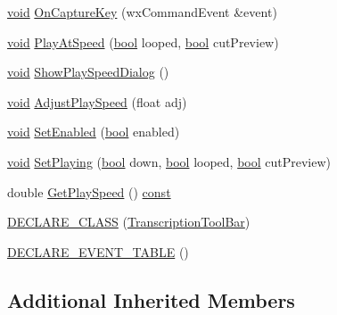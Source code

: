 \begin{DoxyCompactItemize}
\hyperlink{sound_8c_ae35f5844602719cf66324f4de2a658b3}{void} \hyperlink{class_transcription_tool_bar_a500b06f4a6f4785ab1a56805f2eafddd}{On\+Capture\+Key} (wx\+Command\+Event \&event)
\item 
\hyperlink{sound_8c_ae35f5844602719cf66324f4de2a658b3}{void} \hyperlink{class_transcription_tool_bar_ab93a5a98d1380dce51155012020a66b7}{Play\+At\+Speed} (\hyperlink{mac_2config_2i386_2lib-src_2libsoxr_2soxr-config_8h_abb452686968e48b67397da5f97445f5b}{bool} looped, \hyperlink{mac_2config_2i386_2lib-src_2libsoxr_2soxr-config_8h_abb452686968e48b67397da5f97445f5b}{bool} cut\+Preview)
\item 
\hyperlink{sound_8c_ae35f5844602719cf66324f4de2a658b3}{void} \hyperlink{class_transcription_tool_bar_ada783f0faec23b57f89b9bec30997b50}{Show\+Play\+Speed\+Dialog} ()
\item 
\hyperlink{sound_8c_ae35f5844602719cf66324f4de2a658b3}{void} \hyperlink{class_transcription_tool_bar_a51eb2f386a6cbabdc8273cd82916c0a4}{Adjust\+Play\+Speed} (float adj)
\item 
\hyperlink{sound_8c_ae35f5844602719cf66324f4de2a658b3}{void} \hyperlink{class_transcription_tool_bar_a276ba5c75b108b1ed1c723f80a3ba0bf}{Set\+Enabled} (\hyperlink{mac_2config_2i386_2lib-src_2libsoxr_2soxr-config_8h_abb452686968e48b67397da5f97445f5b}{bool} enabled)
\item 
\hyperlink{sound_8c_ae35f5844602719cf66324f4de2a658b3}{void} \hyperlink{class_transcription_tool_bar_abb2327485b01dce7bc77edf5af589b48}{Set\+Playing} (\hyperlink{mac_2config_2i386_2lib-src_2libsoxr_2soxr-config_8h_abb452686968e48b67397da5f97445f5b}{bool} down, \hyperlink{mac_2config_2i386_2lib-src_2libsoxr_2soxr-config_8h_abb452686968e48b67397da5f97445f5b}{bool} looped, \hyperlink{mac_2config_2i386_2lib-src_2libsoxr_2soxr-config_8h_abb452686968e48b67397da5f97445f5b}{bool} cut\+Preview)
\item 
double \hyperlink{class_transcription_tool_bar_a1d2811562c029111eadcd9ef30235a33}{Get\+Play\+Speed} () \hyperlink{getopt1_8c_a2c212835823e3c54a8ab6d95c652660e}{const} 
\item 
\hyperlink{class_transcription_tool_bar_a942bea1d858dcf3e5429eef05d599316}{D\+E\+C\+L\+A\+R\+E\+\_\+\+C\+L\+A\+SS} (\hyperlink{class_transcription_tool_bar}{Transcription\+Tool\+Bar})
\item 
\hyperlink{class_transcription_tool_bar_adb06e3e26ceceb5e5ac90fa1b71c9857}{D\+E\+C\+L\+A\+R\+E\+\_\+\+E\+V\+E\+N\+T\+\_\+\+T\+A\+B\+LE} ()
\end{DoxyCompactItemize}
\subsection*{Additional Inherited Members}


